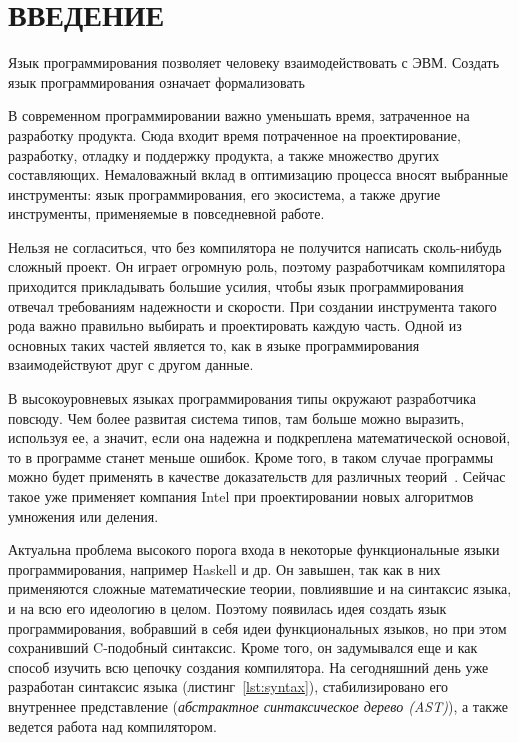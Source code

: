 \chapter*{ВВЕДЕНИЕ}\label{ch:introduction}


Язык программирования позволяет человеку взаимодействовать с ЭВМ.
Создать язык программирования означает формализовать

В современном программировании важно уменьшать время, затраченное на разработку продукта.
Сюда входит время потраченное на проектирование, разработку, отладку и поддержку продукта, а также множество других составляющих.
Немаловажный вклад в оптимизацию процесса вносят выбранные инструменты: язык программирования, его экосистема, а также другие инструменты, применяемые в повседневной работе.

Нельзя не согласиться, что без компилятора не получится написать сколь-нибудь сложный проект.
Он играет огромную роль, поэтому разработчикам компилятора приходится прикладывать большие усилия, чтобы язык программирования отвечал требованиям надежности и скорости.
При создании инструмента такого рода важно правильно выбирать и проектировать каждую часть.
Одной из основных таких частей является то, как в языке программирования взаимодействуют друг с другом данные.

В высокоуровневых языках программирования типы окружают разработчика повсюду.
Чем более развитая система типов, там больше можно выразить, используя ее, а значит, если она надежна и подкреплена математической основой, то в программе станет меньше ошибок.
Кроме того, в таком случае программы можно будет применять в качестве доказательств для различных теорий~\cite{AutoProvement}.
Сейчас такое уже применяет компания Intel при проектировании новых алгоритмов умножения или деления.

Актуальна проблема высокого порога входа в некоторые функциональные языки программирования, например Haskell и др.
Он завышен, так как в них применяются сложные математические теории, повлиявшие и на синтаксис языка, и на всю его идеологию в целом.
Поэтому появилась идея создать язык программирования, вобравший в себя идеи функциональных языков, но при этом сохранивший C-подобный синтаксис.
Кроме того, он задумывался еще и как способ изучить всю цепочку создания компилятора.
На сегодняшний день уже разработан синтаксис языка (листинг~\ref{lst:syntax}), стабилизировано его внутреннее представление (\textit{абстрактное синтаксическое дерево (AST)}), а также ведется работа над компилятором.


